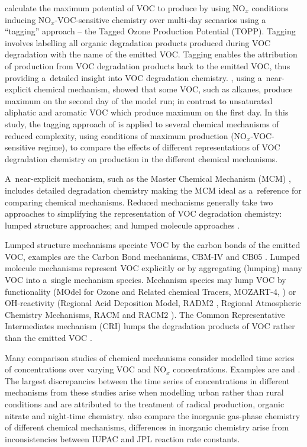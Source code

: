 \documentclass[acpd, online, hvmath]{copernicus}
\providecommand{\DIFadd}[1]{{\protect\color{blue}\uwave{#1}}} %
\providecommand{\DIFaddbegin}{} %
\providecommand{\DIFaddend}{} %
\begin{document}
\citet{Butler:2011} calculate the maximum potential of \DIFaddbegin \DIFadd{a number of }\DIFaddend VOC to produce
 by using NO$_{x}$ conditions inducing
NO$_{x}$-VOC-sensitive chemistry over multi-day scenarios using a
``tagging'' approach -- the Tagged Ozone Production Potential (TOPP).
Tagging involves labelling all organic degradation products produced
during VOC degradation with the name of the emitted VOC.  Tagging
enables the attribution of  production from VOC degradation
products back to the emitted VOC, thus providing a~detailed insight
into VOC degradation chemistry.  \citet{Butler:2011}, using
a~near-explicit chemical mechanism, showed that some VOC, such as
alkanes, produce maximum  on the second day of the model
run; in contrast to unsaturated aliphatic and aromatic VOC which
produce maximum  on the first day.  In this study, the
tagging approach of \citet{Butler:2011} is applied to several chemical
mechanisms of reduced complexity, using conditions of maximum
 production (NO$_{x}$-VOC-sensitive regime), to compare
the effects of different representations of VOC degradation chemistry
on  production in the different chemical mechanisms.

A~near-explicit mechanism, such as the Master Chemical Mechanism (MCM)
\citep{Jenkin:2003, Saunders:2003, Bloss:2005}, includes detailed
degradation chemistry making the MCM ideal as a~reference for
comparing chemical mechanisms.  Reduced mechanisms generally take two
approaches to simplifying the representation of VOC degradation
chemistry: lumped structure approaches; and lumped molecule approaches
\citep{Dodge:2000}.

Lumped structure mechanisms speciate VOC by the carbon bonds of the
emitted VOC, examples are the Carbon Bond mechanisms, CBM-IV
\citep{Gery:1989} and CB05 \citep{Yarwood:2005}.  Lumped molecule
mechanisms represent VOC explicitly or by aggregating (lumping) many
VOC into a~single mechanism species.  Mechanism species may lump VOC
by functionality (MOdel for Ozone and Related chemical Tracers,
MOZART-4, \citealp{Emmons:2010}) or OH-reactivity (Regional Acid
Deposition Model, RADM2 \citep{Stockwell:1990}, Regional Atmospheric
Chemistry Mechanisms, RACM \citep{Stockwell:1997} and RACM2
\citep{Goliff:2013}).  The Common Representative Intermediates
mechanism (CRI) lumps the degradation products of VOC rather than the
emitted VOC \citep{Jenkin:2008}.

Many comparison studies of chemical mechanisms consider modelled time
series of  concentrations over varying VOC and NO$_{x}$
concentrations.  Examples are \citet{Dunker:1984,Kuhn:1998} and
\citet{Emmerson:2009}.  The largest discrepancies between the time
series of  concentrations in different mechanisms from these
studies arise when modelling urban rather than rural conditions and
are attributed to the treatment of radical production, organic nitrate
and night-time chemistry.  \citet{Emmerson:2009} also compare the
inorganic gas-phase chemistry of different chemical mechanisms,
differences in inorganic chemistry arise from inconsistencies between
IUPAC and JPL reaction rate constants.
\end{document}
